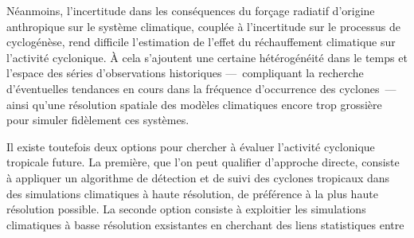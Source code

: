 \documentclass[../main.tex]{subfiles}
\begin{document}
Néanmoins, l'incertitude dans les conséquences du forçage radiatif d'origine anthropique sur le système climatique, couplée à l'incertitude sur le processus de
cyclogénèse, rend difficile l'estimation de l'effet du réchauffement climatique sur l'activité cyclonique. À cela s'ajoutent une certaine hétérogénéité dans
le temps et l'espace des séries d'observations historiques ---~compliquant la recherche d'éventuelles tendances en cours dans la fréquence d'occurrence des
cyclones~--- ainsi qu'une résolution spatiale des modèles climatiques encore trop grossière pour simuler fidèlement ces systèmes.

Il existe toutefois deux options pour chercher à évaluer l'activité cyclonique tropicale future. La première, que l'on peut qualifier d'approche directe,
consiste à appliquer un algorithme de détection et de suivi des cyclones tropicaux dans des simulations climatiques à haute résolution, de préférence à la plus
haute résolution possible. La seconde option consiste à exploitier les simulations climatiques à basse résolution exsistantes en cherchant des liens
statistiques entre 
\end{document}
